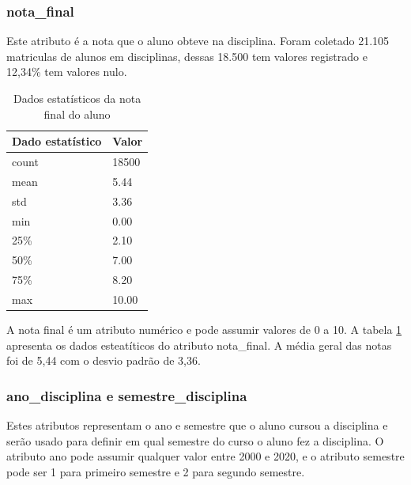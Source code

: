 \documentclass[diss,capa]{texufpel}
\begin{document}
\subsubsection{nota\_final}

Este atributo é a nota que o aluno obteve na disciplina.
Foram coletado 21.105 matriculas de alunos em disciplinas, dessas 18.500 tem valores registrado e 12,34\% tem valores nulo.


\begin{table}[htbp]
\begin{center}
\caption{Dados estatísticos da nota final do aluno}
\label{tab:nota-final}
\begin{tabular}{p{8cm}|p{7cm}}
\hline
Dado estatístico & Valor    \\ \hline
count   & 18500    \\
mean    & 5.44     \\
std     & 3.36     \\
min     & 0.00     \\
25\%    & 2.10     \\
50\%    & 7.00     \\
75\%    & 8.20     \\
max     & 10.00    \\ \hline
\end{tabular}
\end{center}
\end{table}

A nota final é um atributo numérico e pode assumir valores de 0 a 10.
A tabela \ref{tab:nota-final} apresenta os dados esteatíticos do atributo nota\_final. 
A média geral das notas foi de 5,44 com o desvio padrão de 3,36.

\subsubsection{ano\_disciplina e semestre\_disciplina}

Estes atributos representam o ano e semestre que o aluno cursou a disciplina e serão usado para definir em qual semestre do curso o aluno fez a disciplina.
O atributo ano pode assumir qualquer valor entre 2000 e 2020, e o atributo semestre pode ser 1 para primeiro semestre e 2 para segundo semestre.
\end{document}
